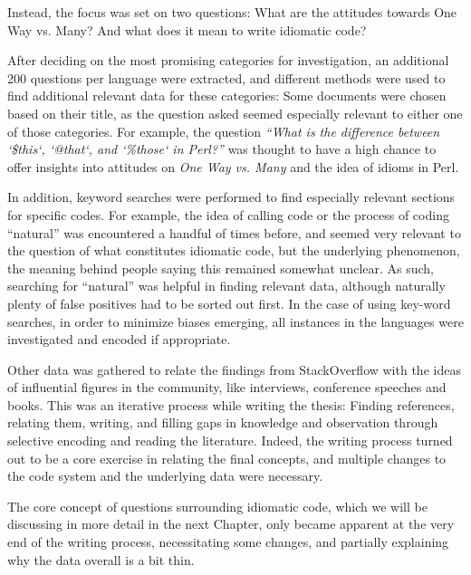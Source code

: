 Instead, the focus was set on two questions: What are the attitudes towards One Way vs. Many? And what does it mean to
 write idiomatic code?

After deciding on the most promising categories for investigation, an additional 200 questions per language were extracted,
and different methods were used to find additional relevant data for these categories:
Some documents were chosen based on their title, as the question asked seemed especially relevant to either one of those
categories.  For example, the question \textit{“What is the difference between `\$this`, `@that`, and `\%those` in Perl?”}
was thought to have a high chance to offer insights into attitudes on \textit{One Way vs. Many} and the idea of idioms in Perl.

In addition, keyword searches were performed to find especially relevant sections for specific codes. For example, the
idea of calling code or the process of coding “natural” was encountered a handful of times before, and seemed very
relevant to the question of what constitutes idiomatic code, but the underlying phenomenon, the meaning behind people
saying this remained somewhat unclear. As such, searching for “natural” was helpful in finding relevant data, although
naturally plenty of false positives had to be sorted out first. In the case of using key-word searches, in order to
minimize biases emerging, all instances in the languages were investigated and encoded if appropriate.

Other data was gathered to relate the findings from StackOverflow with the ideas of influential figures in the community,
like interviews, conference speeches and books. This was an iterative process while writing the thesis: Finding references,
relating them, writing, and filling gaps in knowledge and observation through selective encoding and reading the literature.
Indeed, the writing process turned out to be a core exercise in relating the final concepts, and multiple changes to the code system and
the underlying data were necessary.

The core concept of questions surrounding idiomatic code, which we will be discussing in more detail in the next Chapter,
only became apparent at the very end of the writing process, necessitating some changes, and partially explaining
why the data overall is a bit thin.
